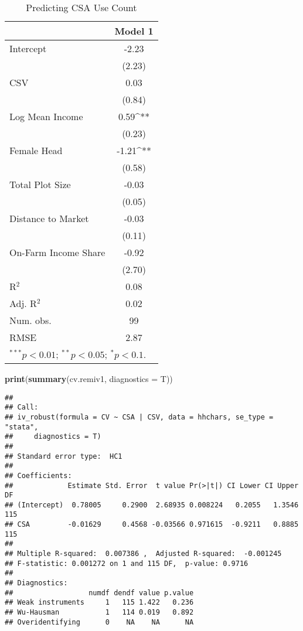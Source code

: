 \documentclass[
]{article}
\newenvironment{Shaded}{\begin{snugshade}}{\end{snugshade}}
\newcommand{\DataTypeTok}[1]{\textcolor[rgb]{0.13,0.29,0.53}{#1}}
\newcommand{\KeywordTok}[1]{\textcolor[rgb]{0.13,0.29,0.53}{\textbf{#1}}}
\newcommand{\NormalTok}[1]{#1}
\begin{document}
\usepackage{siunitx}

\begin{table}
\caption{Predicting CSA Use Count}
\begin{center}
\begin{tabular}{l S[table-format=2.4]}
\hline
 & {Model 1} \\
\hline
Intercept            & -2.23      \\
                     & (2.23)     \\
CSV                  & 0.03       \\
                     & (0.84)     \\
Log Mean Income      & 0.59^{**}  \\
                     & (0.23)     \\
Female Head          & -1.21^{**} \\
                     & (0.58)     \\
Total Plot Size      & -0.03      \\
                     & (0.05)     \\
Distance to Market   & -0.03      \\
                     & (0.11)     \\
On-Farm Income Share & -0.92      \\
                     & (2.70)     \\
\hline
R$^2$                & 0.08       \\
Adj. R$^2$           & 0.02       \\
Num. obs.            & 99         \\
RMSE                 & 2.87       \\
\hline
{}
\end{tabular}
\label{table:coefficients}
\end{center}
\end{table}

\begin{Shaded}
\begin{Highlighting}[]
\KeywordTok{print}\NormalTok{(}\KeywordTok{summary}\NormalTok{(cv.remiv1, }\DataTypeTok{diagnostics =}\NormalTok{ T))}
\end{Highlighting}
\end{Shaded}

\begin{verbatim}
## 
## Call:
## iv_robust(formula = CV ~ CSA | CSV, data = hhchars, se_type = "stata", 
##     diagnostics = T)
## 
## Standard error type:  HC1 
## 
## Coefficients:
##             Estimate Std. Error  t value Pr(>|t|) CI Lower CI Upper  DF
## (Intercept)  0.78005     0.2900  2.68935 0.008224   0.2055   1.3546 115
## CSA         -0.01629     0.4568 -0.03566 0.971615  -0.9211   0.8885 115
## 
## Multiple R-squared:  0.007386 ,  Adjusted R-squared:  -0.001245 
## F-statistic: 0.001272 on 1 and 115 DF,  p-value: 0.9716
## 
## Diagnostics:
##                  numdf dendf value p.value
## Weak instruments     1   115 1.422   0.236
## Wu-Hausman           1   114 0.019   0.892
## Overidentifying      0    NA    NA      NA
\end{verbatim}
\end{document}
